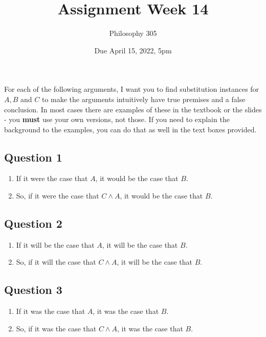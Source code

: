 \documentclass[
  11pt,
]{article}
\title{Assignment Week 14}
\author{Philosophy 305}
\date{Due April 15, 2022, 5pm}
\providecommand{\tightlist}{%
  \setlength{\itemsep}{0pt}\setlength{\parskip}{0pt}}
\begin{document}
\maketitle

For each of the following arguments, I want you to find substitution
instances for \(A, B\) and \(C\) to make the arguments intuitively have
true premises and a false conclusion. In most cases there are examples
of these in the textbook or the slides - you \textbf{must} use your own
versions, not those. If you need to explain the background to the
examples, you can do that as well in the text boxes provided.

\hypertarget{question-1}{%
\subsection{Question 1}\label{question-1}}

\begin{enumerate}
\def\labelenumi{\arabic{enumi}.}
\tightlist
\item
  If it were the case that \(A\), it would be the case that \(B\).
\item
  So, if it were the case that \(C \wedge A\), it would be the case that
  \(B\).
\end{enumerate}

\hypertarget{question-2}{%
\subsection{Question 2}\label{question-2}}

\begin{enumerate}
\def\labelenumi{\arabic{enumi}.}
\tightlist
\item
  If it will be the case that \(A\), it will be the case that \(B\).
\item
  So, if it will the case that \(C \wedge A\), it will be the case that
  \(B\).
\end{enumerate}

\hypertarget{question-3}{%
\subsection{Question 3}\label{question-3}}

\begin{enumerate}
\def\labelenumi{\arabic{enumi}.}
\tightlist
\item
  If it was the case that \(A\), it was the case that \(B\).
\item
  So, if it was the case that \(C \wedge A\), it was the case that
  \(B\).
\end{enumerate}
\end{document}
